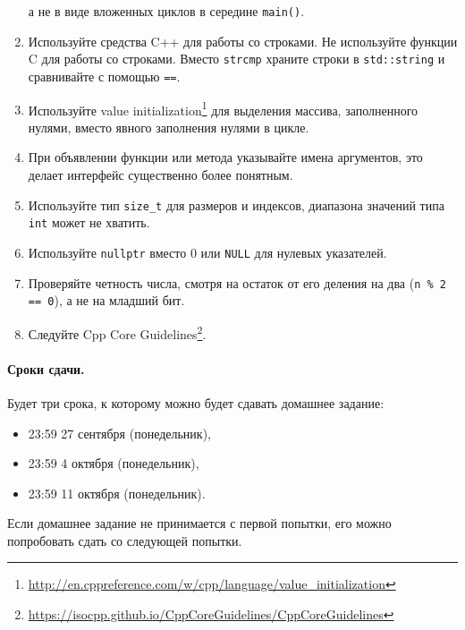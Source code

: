 \documentclass[a4paper,10pt]{article}
\begin{document}
\begin{enumerate}
    а не в виде вложенных циклов в середине {\tt main()}.
    \item Используйте средства C++ для работы со строками.
    Не используйте функции C для работы со строками.
    Вместо {\tt strcmp} храните строки в {\tt std::string} и сравнивайте с помощью {\tt ==}.
    \item Используйте value initialization\footnote{\url{http://en.cppreference.com/w/cpp/language/value_initialization}}
    для выделения массива, заполненного нулями, вместо явного заполнения нулями в цикле.
    \item При объявлении функции или метода указывайте имена аргументов,
    это делает интерфейс существенно более понятным.
    \item Используйте тип {\tt size_t} для размеров и индексов,
    диапазона значений типа {\tt int} может не хватить.
    \item Используйте {\tt nullptr} вместо {0} или {\tt NULL} для нулевых указателей.
    \item Проверяйте четность числа, смотря на остаток от его деления на два
    ({\tt n \% 2 == 0}), а не на младший бит.
    \item Следуйте Cpp Core Guidelines\footnote{\url{https://isocpp.github.io/CppCoreGuidelines/CppCoreGuidelines}}.
\end{enumerate}

\paragraph{Сроки сдачи.}
Будет три срока, к которому можно будет сдавать домашнее задание:
\begin{itemize}
    \item 23:59 27 сентября (понедельник),
    \item 23:59 4 октября (понедельник),
    \item 23:59 11 октября (понедельник).
\end{itemize}
Если домашнее задание не принимается с первой попытки, его
можно попробовать сдать со следующей попытки.
\end{document}

